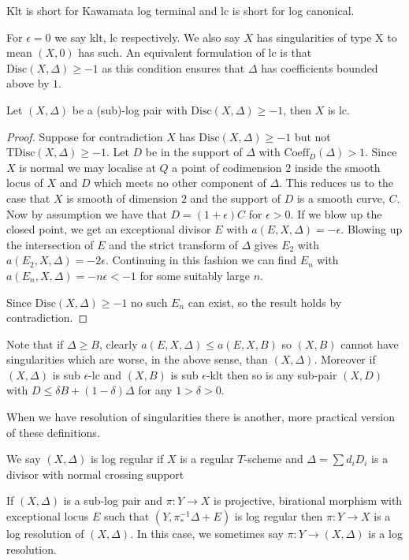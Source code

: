 \begin{remark}
	
	Klt is short for Kawamata log terminal and lc is short for log canonical.
	\end{remark}

For $\epsilon=0$ we say klt, lc respectively. We also say $X$ has singularities of type X to mean $(X,0)$ has such. An equivalent formulation of lc is that $\text{Disc}(X,\Delta) \geq -1$ as this condition ensures that $\Delta$ has coefficients bounded above by $1$.

\begin{lemma}
	
	Let $(X,\Delta)$ be a (sub)-log pair with $\text{Disc}(X,\Delta) \geq -1$, then $X$ is lc.
	
	\end{lemma}

\begin{proof}
	Suppose for contradiction $X$ has $\text{Disc}(X,\Delta) \geq -1$ but not $\text{TDisc}(X,\Delta) \geq -1$. Let $D$ be in the support of $\Delta$ with $\text{Coeff}_{D}(\Delta) > 1$. Since $X$ is normal we may localise at $Q$ a point of codimension $2$ inside the smooth locus of $X$ and $D$ which meets no other component of $\Delta$. This reduces us to the case that $X$ is smooth of dimension $2$ and the support of $D$ is a smooth curve, $C$. Now by assumption we have that $D=(1+\epsilon)C$ for $\epsilon > 0$. If we blow up the closed point, we get an exceptional divisor $E$ with $a(E,X,\Delta)=-\epsilon$. Blowing up the intersection of $E$ and the strict transform of $\Delta$ gives $E_{2}$ with $a(E_{2},X,\Delta)=-2\epsilon$. Continuing in this fashion we can find $E_{n}$ with $a(E_{n},X,\Delta)=-n\epsilon< -1$ for some suitably large $n$.

Since $\text{Disc}(X,\Delta) \geq -1$ no such $E_{n}$ can exist, so the result holds by contradiction.
\end{proof}

Note that if $\Delta \geq B$, clearly $a(E,X,\Delta) \leq a(E,X,B)$ so $(X,B)$ cannot have singularities which are worse, in the above sense, than $(X,\Delta)$. Moreover if $(X,\Delta)$ is sub $\epsilon$-lc and $(X,B)$ is sub $\epsilon$-klt then so is any sub-pair  $(X,D)$ with $D \leq \delta B+(1-\delta)\Delta$ for any $1>\delta >0$.

When we have resolution of singularities there is another, more practical version of these definitions.

\begin{definition}
	
	We say $(X,\Delta)$ is log regular if $X$ is a regular $T$-scheme and $\Delta=\sum d_{i}D_{i}$ is a divisor with normal crossing support
	
	If $(X,\Delta)$ is a sub-log pair and $\pi:Y \to X$ is projective, birational morphism with exceptional locus $E$ such that $(Y,\pi^{-1}_{*}\Delta+E)$ is log regular then $\pi:Y\to X$ is a log resolution of $(X,\Delta)$. In this case, we sometimes say $\pi:Y \to (X,\Delta)$ is a log resolution.
	
\end{definition}

